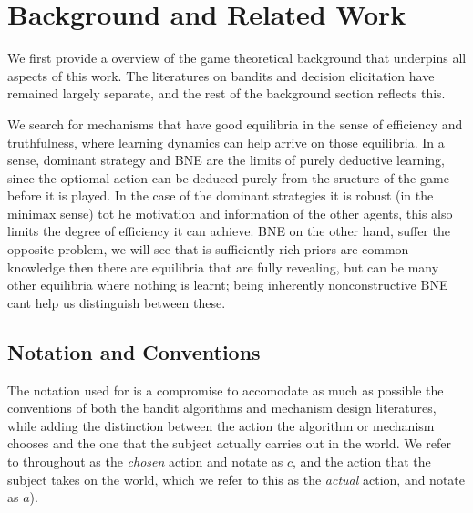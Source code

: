 \chapter{Background and Related Work}
\label{cha:background}




We first provide a overview of the game theoretical background that underpins all aspects of this work. The literatures on bandits and decision elicitation have remained largely separate, and the rest of the background section reflects this. 


We search for mechanisms that have good equilibria in the sense of efficiency and truthfulness, where learning dynamics can help arrive on those equilibria. In a sense, dominant strategy and BNE are the limits of purely deductive learning, since the optiomal action can be deduced purely from the sructure of the game before it is played. In the case of the dominant strategies it is robust (in the minimax sense) tot he motivation and information of the other agents, this also limits the degree of efficiency it can achieve. BNE on the other hand, suffer the opposite problem, we will see that is sufficiently rich priors are common knowledge then there are equilibria that are fully revealing, but can be many other equilibria where nothing is learnt; being inherently nonconstructive BNE cant help us distinguish between these. 


\section{Notation and Conventions}


The notation used for is a compromise to accomodate as much as possible the conventions of both the bandit algorithms and mechanism design literatures, while adding the distinction between the action the algorithm or mechanism chooses and the one that the subject actually carries out in the world. We refer to throughout as the \emph{chosen} action and notate as $c$, and the action that the subject takes on the world, which we refer to this as the \emph{actual} action, and notate as $a$).

